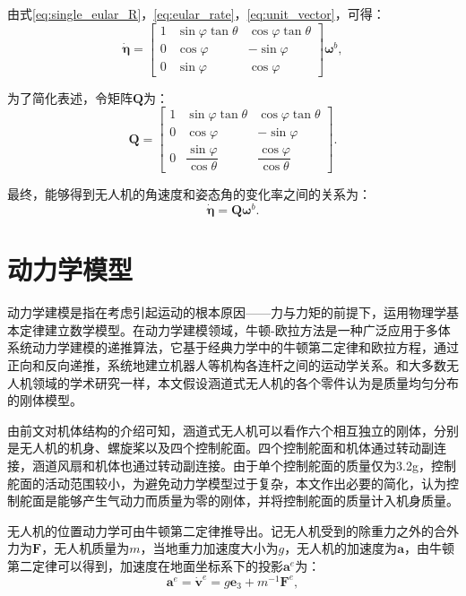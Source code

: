 由式\eqref{eq:single_eular_R}，\eqref{eq:eular_rate}，\eqref{eq:unit_vector}，可得：
\begin{equation}
\dot{\boldsymbol{\eta}} = 
\begin{bmatrix}
1 & \sin\varphi\tan\theta & \cos\varphi\tan\theta \\
0 & \cos\varphi & -\sin\varphi \\
0 & \sin\varphi & \cos\varphi
\end{bmatrix}
\boldsymbol{\omega}^b,
\end{equation}

为了简化表述，令矩阵$\boldsymbol{Q}$为：
\begin{equation}
\boldsymbol{Q} = 
\begin{bmatrix}
1 & \sin\varphi\tan\theta & \cos\varphi\tan\theta \\[6pt]
0 & \cos\varphi & -\sin\varphi \\[6pt]
0 & \dfrac{\sin\varphi}{\cos\theta} & \dfrac{\cos\varphi}{\cos\theta}
\end{bmatrix}.
\end{equation}

最终，能够得到无人机的角速度和姿态角的变化率之间的关系为：
\begin{equation}
    \dot{\boldsymbol{\eta}} = \boldsymbol{Q}\boldsymbol{\omega}^b.
    \label{eq:d_eular}
\end{equation}

\section{动力学模型}
动力学建模是指在考虑引起运动的根本原因——力与力矩的前提下，运用物理学基本定律建立数学模型。在动力学建模领域，牛顿-欧拉方法是一种广泛应用于多体系统动力学建模的递推算法，它基于经典力学中的牛顿第二定律和欧拉方程，通过正向和反向递推，系统地建立机器人等机构各连杆之间的运动学关系。和大多数无人机领域的学术研究一样，本文假设涵道式无人机的各个零件认为是质量均匀分布的刚体模型。

由前文对机体结构的介绍可知，涵道式无人机可以看作六个相互独立的刚体，分别是无人机的机身、螺旋桨以及四个控制舵面。四个控制舵面和机体通过转动副连接，涵道风扇和机体也通过转动副连接。由于单个控制舵面的质量仅为3.2g，控制舵面的活动范围较小，为避免动力学模型过于复杂，本文作出必要的简化，认为控制舵面是能够产生气动力而质量为零的刚体，并将控制舵面的质量计入机身质量。

无人机的位置动力学可由牛顿第二定律推导出。记无人机受到的除重力之外的合外力为$\boldsymbol{F}$，无人机质量为$m$，当地重力加速度大小为$g$，无人机的加速度为$\boldsymbol{a}$，由牛顿第二定律可以得到，加速度在地面坐标系下的投影$\boldsymbol{a}^e$为：
\begin{equation}
    \boldsymbol{a}^e = \dot{\boldsymbol{v}}^e = g\boldsymbol{e}_{3} + m^{-1} \boldsymbol{F}^e,
    \label{eq:a_e}
\end{equation}

